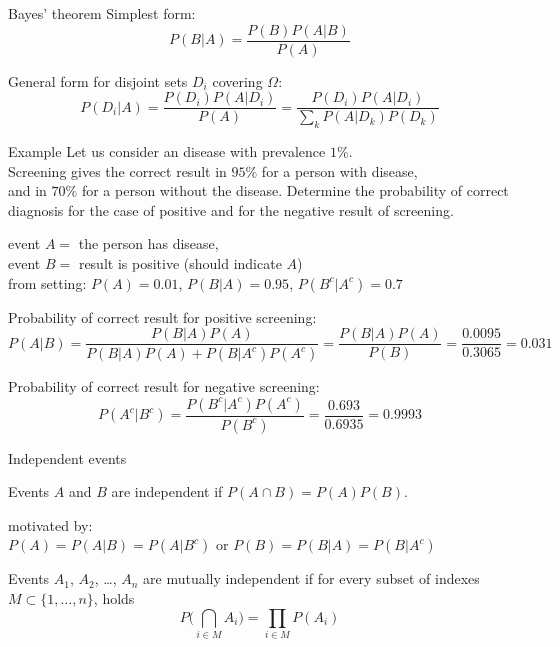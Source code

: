 \documentclass[smaller]{beamer}
\def\df#1{{\usebeamercolor[fg]{my orange} #1}}
\def\xskip{{\vspace{2ex}}}
\begin{document}
\begin{frame}{Bayes' theorem}
Simplest form:
\[
 P(B| A) = \frac{P(B) P(A|B)}{P(A)}
\]

\xskip
General form for disjoint sets $D_i$ covering $\Omega$:
\[
 P(D_i| A) = \frac{P(D_i) P(A|D_i)}{P(A)} = \frac{P(D_i) P(A|D_i)}{\sum_k P(A|D_k)P(D_k)}
\]

\end{frame}


\begin{frame}{Example}
Let us consider an disease with prevalence $1\%$.\\
Screening gives the correct result in $95\%$ for a person with disease,\\
and in $70\%$ for a person without the disease.
Determine the probability of correct diagnosis for the case of positive and for the negative 
result of screening.

\pause
\xskip
event $A=$ the person has disease,\\
event $B=$ result is positive (should indicate $A$)\\
from setting: $P(A) = 0.01$, $P(B| A) = 0.95$, $P(B^c|A^c)=0.7$

\xskip
Probability of correct result for positive screening:
   \[
     P(A| B) = \frac{P(B| A) P(A)}{P(B| A)P(A) + P(B| A^c)P(A^c)}=
 \frac{P(B| A) P(A)}{P(B)} = \frac{0.0095}{0.3065}=0.031
   \]

Probability of correct result for negative screening:
   \[
     P(A^c| B^c) =
 \frac{P(B^c| A^c) P(A^c)}{P(B^c)} = \frac{0.693}{0.6935}=0.9993
   \]
\end{frame}

\begin{frame}{Independent events}
\begin{definition}
Events $A$ and $B$ are \df{independent} if $P(A\cap B) = P(A)P(B)$.
\end{definition}

\xskip
motivated by:\\
$P(A) = P(A|B)=P(A | B^c)$ or $P(B) = P(B|A)=P(B | A^c)$

\xskip
Events $A_1$, $A_2$, \dots, $A_n$ are \df{mutually independent} if for every subset of 
indexes $M \subset \{1,\dots,n\}$, holds
\[
P\big(\bigcap_{i\in M} A_i\big) = \prod_{i\in M} P(A_i)
\]

\end{frame}





  
\end{document}
